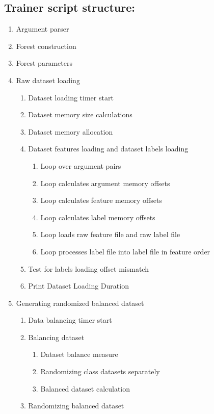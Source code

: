 \documentclass[12pt,oneside]{book}
\begin{document}
\subsection*{Trainer script structure:}
\begin{enumerate}
  \item Argument parser
  \item Forest construction
  \item Forest parameters
  \item Raw dataset loading
  \begin{enumerate}
    \item Dataset loading timer start
    \item Dataset memory size calculations
    \item Dataset memory allocation
    \item Dataset features loading %
          and dataset labels loading %
    \begin{enumerate}
      \item Loop over argument pairs
      \item Loop calculates argument memory offsets
      \item Loop calculates feature memory offsets
      \item Loop calculates label memory offsets
      \item Loop loads raw feature file and raw label file
      \item Loop processes label file into label file in feature order
    \end{enumerate}
    \item Test for labels loading offset mismatch
    \item Print Dataset Loading Duration
  \end{enumerate}
  \item Generating randomized balanced dataset
  \begin{enumerate}
    \item Data balancing timer start
    \item Balancing dataset
    \begin{enumerate}
      \item Dataset balance measure
      \item Randomizing class datasets separately
      \item Balanced dataset calculation  
    \end{enumerate}
    \item Randomizing balanced dataset

\end{enumerate}
\end{enumerate}
\end{document}
